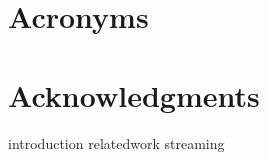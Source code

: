\documentclass[openright,titlepage,numbers=noenddot,headinclude,footinclude=true,cleardoublepage=empty,BCOR=5mm,paper=a4,fontsize=11pt,]{scrreprt}
\begin{document}




\newpage
{}
\tableofcontents
\chapter*{Acronyms}

\listoffigures
\listoftables

\cleardoublepage


\cleardoublepage


\newtheorem{mydef}{Definition}
\chapter*{Acknowledgments}


\pagestyle{plain}

{introduction}
{relatedwork}
{streaming}






\nocite{*}



\begingroup
\RaggedRight
\printbibliography
\endgroup

\end{document}
